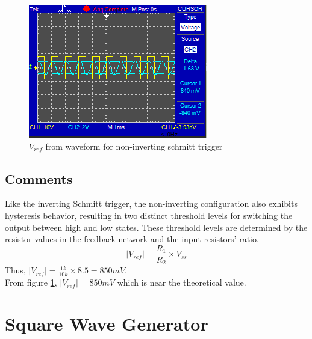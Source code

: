 \documentclass[a4paper, 12pt, english]{article}
\newlength{\simheight}
\begin{document}
\begin{figure}[H]
    \centering
    \includegraphics[width=\linewidth, height=\simheight]{images/Non-Inverting-Schmitt-Trigger-Vref-Cursor.png}
    \caption{$V_{ref}$ from waveform for non-inverting schmitt trigger}
    \label{fig:$V_{ref}$ from waveform for non-inverting schmitt trigger}
\end{figure}

\subsection{Comments}
Like the inverting Schmitt trigger, the non-inverting configuration also exhibits hysteresis behavior, resulting in two distinct threshold levels for switching the output between high and low states. These threshold levels are determined by the resistor values in the feedback network and the input resistors' ratio.
\[ |V_{ref}| = \frac{R_{1}}{R_{2}}  \times V_{ss}\]
Thus, \(|V_{ref}|=\frac{1k}{10k}\times8.5=850mV\). \\
From figure \ref{fig:$V_{ref}$ from waveform for non-inverting schmitt trigger}, $|V_{ref}|=850mV$ which is near the theoretical value.

\newpage

\section{Square Wave Generator}
\end{document}
